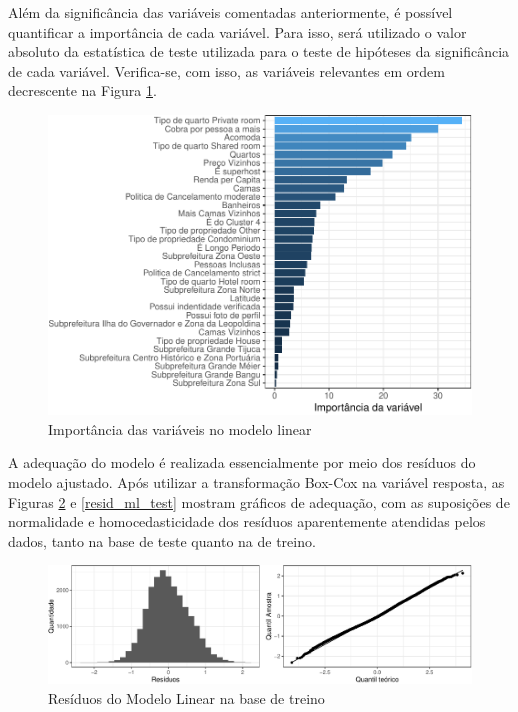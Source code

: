 \documentclass[
	12pt,				%
	a4paper,		%
	oneside,    %
	chapter=TITLE,		   %
	section=TITLE,		   %
	subsection=TITLE,	   %
	subsubsection=TITLE, %
	english,			%
	french,				%
	spanish,			%
	brazil,				%
]{abntex2}
\begin{document}
Além da significância das variáveis comentadas anteriormente, é possível
quantificar a importância de cada variável. Para isso, será utilizado o
valor absoluto da estatística de teste utilizada para o teste de
hipóteses da significância de cada variável. Verifica-se, com isso, as
variáveis relevantes em ordem decrescente na Figura \ref{imp_ml}.

\begin{figure}
\centering
\includegraphics{00-TCC_files/figure-latex/imp_ml-1.pdf}
\caption{\label{imp_ml}Importância das variáveis no modelo linear}
\end{figure}

A adequação do modelo é realizada essencialmente por meio dos resíduos
do modelo ajustado. Após utilizar a transformação Box-Cox na variável
resposta, as Figuras \ref{resid_ml} e \ref{resid_ml_test} mostram
gráficos de adequação, com as suposições de normalidade e
homocedasticidade dos resíduos aparentemente atendidas pelos dados,
tanto na base de teste quanto na de treino.

\begin{figure}
\centering
\includegraphics{00-TCC_files/figure-latex/resid_ml-1.pdf}
\caption{\label{resid_ml}Resíduos do Modelo Linear na base de treino}
\end{figure}
\end{document}
